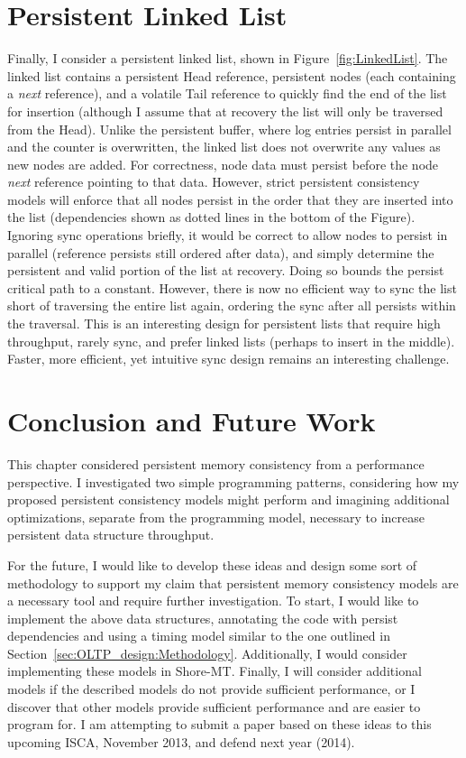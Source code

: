 \section{Persistent Linked List}
\label{sec:PMC_patterns:LinkedList}



Finally, I consider a persistent linked list, shown in Figure~\ref{fig:LinkedList}.
The linked list contains a persistent Head reference, persistent nodes (each containing a \emph{next} reference), and a volatile Tail reference to quickly find the end of the list for insertion (although I assume that at recovery the list will only be traversed from the Head).
Unlike the persistent buffer, where log entries persist in parallel and the counter is overwritten, the linked list does not overwrite any values as new nodes are added.
For correctness, node data must persist before the node \emph{next} reference pointing to that data.
However, strict persistent consistency models will enforce that all nodes persist in the order that they are inserted into the list (dependencies shown as dotted lines in the bottom of the Figure).
Ignoring sync operations briefly, it would be correct to allow nodes to persist in parallel (reference persists still ordered after data), and simply determine the persistent and valid portion of the list at recovery.
Doing so bounds the persist critical path to a constant.
However, there is now no efficient way to sync the list short of traversing the entire list again, ordering the sync after all persists within the traversal.
This is an interesting design for persistent lists that require high throughput, rarely sync, and prefer linked lists (perhaps to insert in the middle).
Faster, more efficient, yet intuitive sync design remains an interesting challenge.

\section{Conclusion and Future Work}
\label{sec:PMC_patterns:Conclusion}

This chapter considered persistent memory consistency from a performance perspective.
I investigated two simple programming patterns, considering how my proposed persistent consistency models might perform and imagining additional optimizations, separate from the programming model, necessary to increase persistent data structure throughput.

For the future, I would like to develop these ideas and design some sort of methodology to support my claim that persistent memory consistency models are a necessary tool and require further investigation.
To start, I would like to implement the above data structures, annotating the code with persist dependencies and using a timing model similar to the one outlined in Section~\ref{sec:OLTP_design:Methodology}.
Additionally, I would consider implementing these models in Shore-MT.
Finally, I will consider additional models if the described models do not provide sufficient performance, or I discover that other models provide sufficient performance and are easier to program for.
I am attempting to submit a paper based on these ideas to this upcoming ISCA, November 2013, and defend next year (2014).

